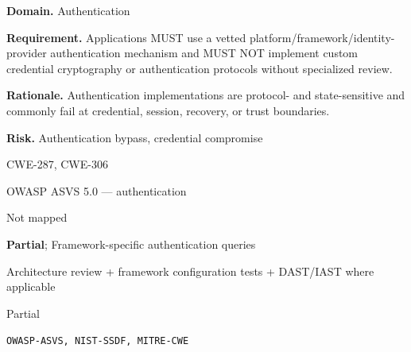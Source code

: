 \documentclass[10pt,letterpaper]{article}
\newcommand{\prioritybadge}[2]{\tcbox[on line,boxrule=0pt,arc=1.2mm,boxsep=0.7mm,left=1mm,right=1mm,top=0.4mm,bottom=0.4mm,colback=#2!12,coltext=#2]{\scriptsize\bfseries #1}}
\begin{document}
\begin{rulebox}[title={\texttt{SCS-ALL-AUTHN-001} \hfill \prioritybadge{Critical Control}{Critical}}]
\textbf{Domain.} Authentication

\textbf{Requirement.} Applications MUST use a vetted platform/framework/identity-provider authentication mechanism and MUST NOT implement custom credential cryptography or authentication protocols without specialized review.

\textbf{Rationale.} Authentication implementations are protocol- and state-sensitive and commonly fail at credential, session, recovery, or trust boundaries.

\textbf{Risk.} Authentication bypass, credential compromise

\begin{description}[leftmargin=2.65cm,labelwidth=2.3cm,style=nextline,itemsep=1pt,topsep=3pt]
  \item[CWE] CWE-287, CWE-306
  \item[OWASP] OWASP ASVS 5.0 --- authentication
  \item[CERT] Not mapped
  \item[CodeQL] \textbf{Partial}; Framework-specific authentication queries
  \item[Enforcement] Architecture review + framework configuration tests + DAST/IAST where applicable
  \item[Automation] Partial
  \item[Sources] \texttt{OWASP-ASVS, NIST-SSDF, MITRE-CWE}
\end{description}
\end{rulebox}
\end{document}
